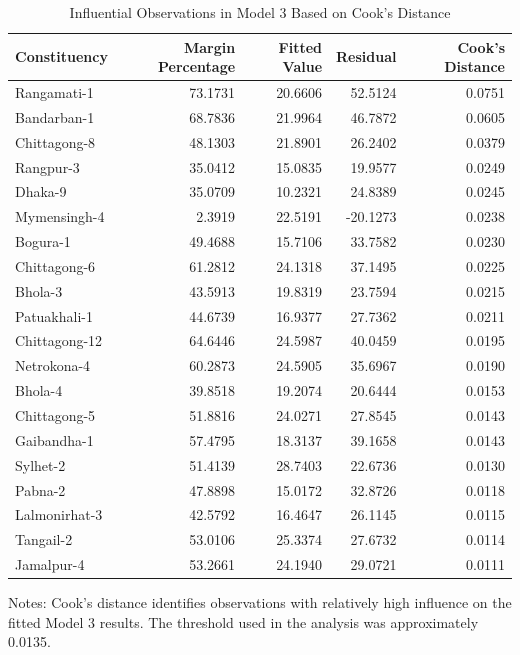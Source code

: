 \documentclass[12pt,a4paper]{article}
\begin{document}
\begin{table}[H]
\centering
\caption{Influential Observations in Model 3 Based on Cook's Distance}
\label{tab:appendix_cooks_observations}
\scriptsize
\begin{tabular}{lrrrr}
\toprule
Constituency & Margin Percentage & Fitted Value & Residual & Cook's Distance \\
\midrule
Rangamati-1 & 73.1731 & 20.6606 & 52.5124 & 0.0751 \\
Bandarban-1 & 68.7836 & 21.9964 & 46.7872 & 0.0605 \\
Chittagong-8 & 48.1303 & 21.8901 & 26.2402 & 0.0379 \\
Rangpur-3 & 35.0412 & 15.0835 & 19.9577 & 0.0249 \\
Dhaka-9 & 35.0709 & 10.2321 & 24.8389 & 0.0245 \\
Mymensingh-4 & 2.3919 & 22.5191 & -20.1273 & 0.0238 \\
Bogura-1 & 49.4688 & 15.7106 & 33.7582 & 0.0230 \\
Chittagong-6 & 61.2812 & 24.1318 & 37.1495 & 0.0225 \\
Bhola-3 & 43.5913 & 19.8319 & 23.7594 & 0.0215 \\
Patuakhali-1 & 44.6739 & 16.9377 & 27.7362 & 0.0211 \\
Chittagong-12 & 64.6446 & 24.5987 & 40.0459 & 0.0195 \\
Netrokona-4 & 60.2873 & 24.5905 & 35.6967 & 0.0190 \\
Bhola-4 & 39.8518 & 19.2074 & 20.6444 & 0.0153 \\
Chittagong-5 & 51.8816 & 24.0271 & 27.8545 & 0.0143 \\
Gaibandha-1 & 57.4795 & 18.3137 & 39.1658 & 0.0143 \\
Sylhet-2 & 51.4139 & 28.7403 & 22.6736 & 0.0130 \\
Pabna-2 & 47.8898 & 15.0172 & 32.8726 & 0.0118 \\
Lalmonirhat-3 & 42.5792 & 16.4647 & 26.1145 & 0.0115 \\
Tangail-2 & 53.0106 & 25.3374 & 27.6732 & 0.0114 \\
Jamalpur-4 & 53.2661 & 24.1940 & 29.0721 & 0.0111 \\
\bottomrule
\end{tabular}
\begin{flushleft}
\footnotesize Notes: Cook's distance identifies observations with relatively high influence on the fitted Model 3 results. The threshold used in the analysis was approximately 0.0135.
\end{flushleft}
\end{table}
\end{document}
